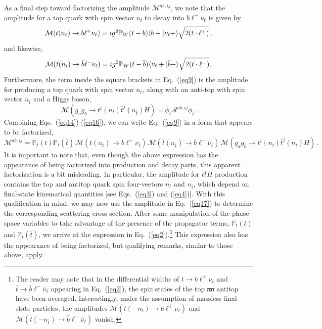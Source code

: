 \documentclass[aps,preprint,tightenlines,floatfix,superscriptaddress,nofootinbib,showpacs]{revtex4-1}
\def\beq{\begin{equation}}
\def\eeq{\end{equation}}
\def\tbar{\bar{t}}
\providecommand{\DIFadd}[1]{{\protect\color{blue}\uwave{#1}}} %
\providecommand{\DIFdel}[1]{{\protect\color{red}\sout{#1}}}                      %
\providecommand{\DIFaddbegin}{} %
\providecommand{\DIFaddend}{} %
\providecommand{\DIFdelbegin}{} %
\providecommand{\DIFdelend}{} %
\begin{document}
As a final step toward factorizing the amplitude $\mathcal{M}^{ab,ij}$,
we note that the amplitude for a top quark with spin vector
$n_t$ to decay into $b{\ell}^+\nu_{\ell}$ is given by
%
\beq
\label{eq14}
\mathcal{M}(t(n_t)\to b{\ell}^+\nu_{\ell})=ig^2\mathbb{P}_W(t-b)\langle b-|\nu_{\ell}+\rangle\sqrt{\strut2(t\cdot {\ell}^+)} \,,
\eeq
%
and likewise,
%
\beq
\label{eq15}
\mathcal{M}(\tbar(n_{\tbar})\to \bar{b}{\ell}^-\bar{\nu}_{\ell})=ig^2\mathbb{P}_W(\tbar-\bar{b})\langle \bar{\nu}_{\ell}+|\bar{b}-\rangle\sqrt{\strut2(\tbar\cdot {\ell}^-)}.
\eeq
%
Furthermore, the term inside the square brackets in
Eq.~(\ref{eq9}) is the amplitude for producing a top quark
with spin vector $n_t$, along with an anti-top with spin vector
$n_{\tbar}$ and a Higgs boson,
%
\beq
\label{eq16}
\mathcal{M}(g_ag_b \to t^i(n_t)\tbar^j(n_{\tbar})H)=\bar{\phi}_t \mathcal{A}^{ab,ij}\phi_{\tbar}.
\eeq
%
Combining Eqs.~(\ref{eq14})-(\ref{eq16}), we can write Eq.~(\ref{eq9})
in a form that appears to be factorized,
%
\beq
\label{eq17}
\mathcal{M}^{ab,ij}=\mathbb{P}_t(t)\mathbb{P}_t(\tbar)\,\mathcal{M}(t(n_t)\to b{\ell}^+\nu_{\ell})\,\mathcal{M}(\tbar(n_{\tbar})\to \bar{b}{\ell}^-\bar{\nu}_{\ell})\,\mathcal{M}(g_ag_b \to t^i(n_t)\tbar^j(n_{\tbar})H) \,.
\eeq
%
It is important
to note that, even though the above expression has the appearance of being
factorized into production and decay parts, this apparent
factorization is a bit misleading.  In particular, the amplitude for
$t\tbar H$ production contains the top and antitop quark
spin four-vectors $n_t$ and $n_{\tbar}$, which
depend on final-state kinematical quantities [see
Eqs.~(\ref{eq3}) and (\ref{eq4})].
With this qualification in mind, we may now use the
amplitude in Eq.~(\ref{eq17})
to determine the corresponding scattering cross section.
After some manipulation of the phase space variables
to take advantage of the presence of the
propagator terms, $\mathbb{P}_t(t)$ and $\mathbb{P}_t(\tbar)$,
we arrive at the expression in Eq.~(\ref{eq2}).\footnote{The reader may note that in the differential widths of $t\to b{\ell}^+\nu_{\ell}$ and $\tbar\to \bar{b}{\ell}^-\bar{\nu}_{\ell}$ appearing in 
Eq.~(\ref{eq2}), the spin states of the top \DIFdelbegin \DIFdel{an }\DIFdelend \DIFaddbegin \DIFadd{and }\DIFaddend antitop have been averaged. Interestingly, under the assumption of massless final-state particles, the amplitudes $\mathcal{M}(t(-n_t)\to b{\ell}^+\nu_{\ell})$ and $\mathcal{M}(\tbar(-n_{\tbar})\to \bar{b}{\ell}^-\bar{\nu}_{\ell})$ vanish. } This expression
also has the appearance of being factorized, but
qualifying remarks, similar to those above, apply.
\end{document}
